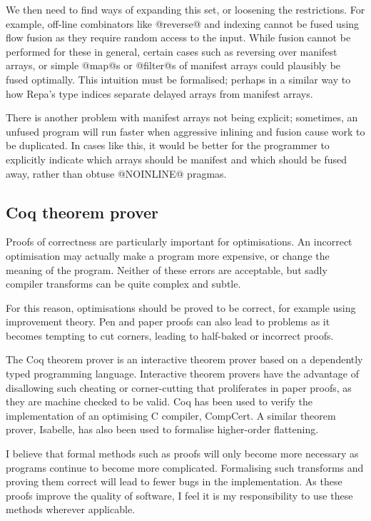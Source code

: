 \documentclass[12pt,a4paper]{article}
\begin{document}
We then need to find ways of expanding this set, or loosening the restrictions.
For example, off-line combinators like @reverse@ and indexing cannot be fused using flow fusion as they require random access to the input.
While fusion cannot be performed for these in general, certain cases such as reversing over manifest arrays, or simple @map@s or @filter@s of manifest arrays could plausibly be fused optimally.
This intuition must be formalised; perhaps in a similar way to how Repa's type indices\cite{lippmeier2012guiding} separate delayed arrays from manifest arrays.

There is another problem with manifest arrays not being explicit;
sometimes, an unfused program will run faster when aggressive inlining and fusion cause work to be duplicated.
In cases like this, it would be better for the programmer to explicitly indicate which arrays should be manifest and which should be fused away,
rather than obtuse @NOINLINE@ pragmas.


\subsection{Coq theorem prover}
Proofs of correctness are particularly important for optimisations.
An incorrect optimisation may actually make a program more expensive, or change the meaning of the program.
Neither of these errors are acceptable, but sadly compiler transforms can be quite complex and subtle.

For this reason, optimisations should be proved to be correct, for example using improvement theory\cite{sands1998improvement}.
Pen and paper proofs can also lead to problems as it becomes tempting to cut corners,
leading to half-baked or incorrect proofs.

The Coq theorem prover is an interactive theorem prover based on a dependently typed programming language\cite{harper2012practical}.
Interactive theorem provers have the advantage of disallowing such cheating or corner-cutting that proliferates in paper proofs,
as they are machine checked to be valid.
Coq has been used to verify the implementation of an optimising C compiler, CompCert\cite{leroy2012compcert}.
A similar theorem prover, Isabelle, has also been used to formalise higher-order flattening\cite{leshchinskiy2005higher}.

I believe that formal methods such as proofs will only become more necessary as programs continue to become more complicated.
Formalising such transforms and proving them correct will lead to fewer bugs in the implementation.
As these proofs improve the quality of software, I feel it is my responsibility to use these methods wherever applicable.
\end{document}
